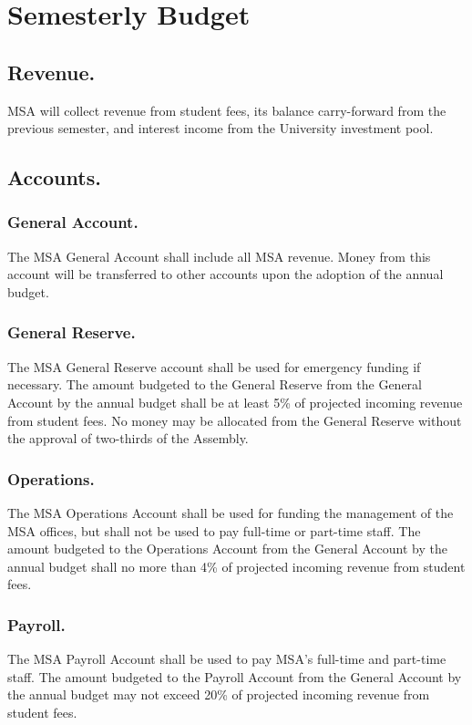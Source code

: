 
\section{Semesterly Budget}

\subsection{Revenue.}
MSA will collect revenue from student fees, its balance carry-forward from the previous semester, and interest income from the University investment pool.  


\subsection{Accounts.}

\subsubsection{General Account.}
The MSA General Account shall include all MSA revenue.  Money from this account will be transferred to other accounts upon the adoption of the annual budget.

\subsubsection{General Reserve.}
The MSA General Reserve account shall be used for emergency funding if necessary.  The amount budgeted to the General Reserve from the General Account by the annual budget shall be at least 5\% of projected incoming revenue from student fees.  No money may be allocated from the General Reserve without the approval of two-thirds of the Assembly.

\subsubsection{Operations.}
The MSA Operations Account shall be used for funding the management of the MSA offices, but shall not be used to pay full-time or part-time staff.  The amount budgeted to the Operations Account from the General Account by the annual budget shall no more than 4\% of projected incoming revenue from student fees.

\subsubsection{Payroll.}
The MSA Payroll Account shall be used to pay MSA's full-time and part-time staff.  The amount budgeted to the Payroll Account from the General Account by the annual budget may not exceed 20\% of projected incoming revenue from student fees.

